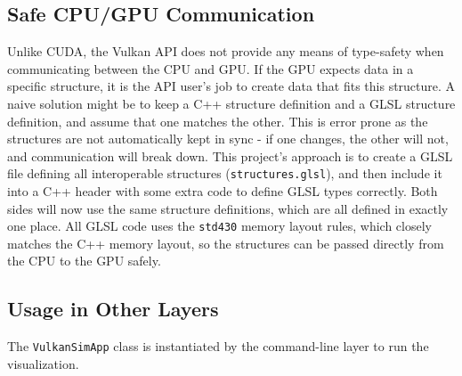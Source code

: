 \subsection{Safe CPU/GPU Communication}\label{sec:Impl:Viz:CPUGPUSafety}
Unlike CUDA, the Vulkan API does not provide any means of type-safety when communicating between the CPU and GPU.
If the GPU expects data in a specific structure, it is the API user's job to create data that fits this structure.
A naive solution might be to keep a C++ structure definition and a GLSL structure definition, and assume that one matches the other.
This is error prone as the structures are not automatically kept in sync - if one changes, the other will not, and communication will break down.
This project's approach is to create a GLSL file defining all interoperable structures (\texttt{structures.glsl}), and then include it into a C++ header with some extra code to define GLSL types correctly.
Both sides will now use the same structure definitions, which are all defined in exactly one place.
All GLSL code uses the \texttt{std430} memory layout rules, which closely matches the C++ memory layout, so the structures can be passed directly from the CPU to the GPU safely.

\subsection{Usage in Other Layers}
The \texttt{VulkanSimApp} class is instantiated by the command-line layer to run the visualization.